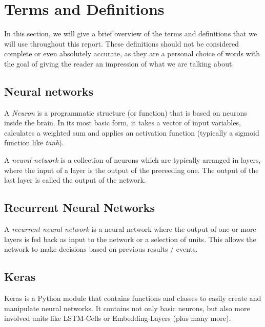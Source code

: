 \section{Terms and Definitions}
\label{sec:terms_and_definitions}

  In this section, we will give a brief overview of the terms and definitions
  that we will use throughout this report. These definitions should not be
  considered complete or even absolutely accurate, as they are a personal
  choice of words with the goal of giving the reader an impression of what
  we are talking about.

  \subsection{Neural networks}
  \label{sub:neural_networks}
  
    A \textit{Neuron} is a programmatic structure (or function) that is based
    on neurons inside the brain. In its most basic form, it takes a vector of
    input variables, calculates a weighted sum and applies an activation function
    (typically a sigmoid function like \textit{tanh}).

    A \textit{neural network} is a collection of neurons which are typically
    arranged in layers, where the input of a layer is the output of the
    preceeding one. The output of the last layer is called the output of
    the network.

  \subsection{Recurrent Neural Networks}
  \label{sub:recurrent_neural_networks}
  
    A \textit{recurrent neural network} is a neural network where the
    output of one or more layers is fed back as input to the network
    or a selection of units. This allows the network to make decisions
    based on previous results / events.


  \subsection{Keras}
  \label{sub:keras}
  
    Keras is a Python module that contains functions and classes to easily create
    and manipulate neural networks. It contains not only basic neurons, but
    also more involved units like LSTM-Cells or Embedding-Layers (plus
    many more).
